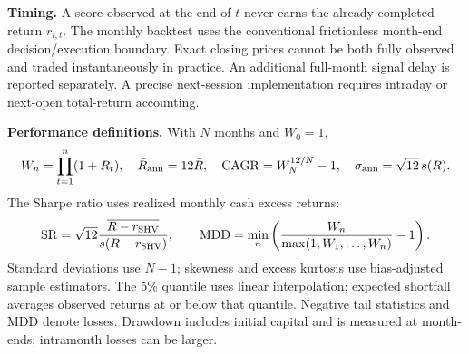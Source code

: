 \documentclass[11pt,letterpaper]{article}
\begin{document}
\textbf{Timing.} A score observed at the end of \(t\) never earns the already-completed return \(r_{i,t}\). The monthly backtest uses the conventional frictionless month-end decision/execution boundary. Exact closing prices cannot be both fully observed and traded instantaneously in practice. An additional full-month signal delay is reported separately. A precise next-session implementation requires intraday or next-open total-return accounting.

\textbf{Performance definitions.} With \(N\) months and \(W_0=1\),
\[
 W_n=\prod_{t=1}^{n}(1+R_t),\quad
 \bar R_{\rm ann}=12\bar R,\quad
 {\rm CAGR}=W_N^{12/N}-1,\quad
 \sigma_{\rm ann}=\sqrt{12}\,s(R).
\]
The Sharpe ratio uses realized monthly cash excess returns:
\[
 {\rm SR}=\sqrt{12}\frac{\overline{R-r_{\mathrm{SHV}}}}
 {s(R-r_{\mathrm{SHV}})},\qquad
 {\rm MDD}=\min_n\left(\frac{W_n}{\max(1,W_1,\ldots,W_n)}-1\right).
\]
Standard deviations use \(N-1\); skewness and excess kurtosis use bias-adjusted sample estimators. The 5\% quantile uses linear interpolation; expected shortfall averages observed returns at or below that quantile. Negative tail statistics and MDD denote losses. Drawdown includes initial capital and is measured at month-ends; intramonth losses can be larger.

\newpage
\end{document}

